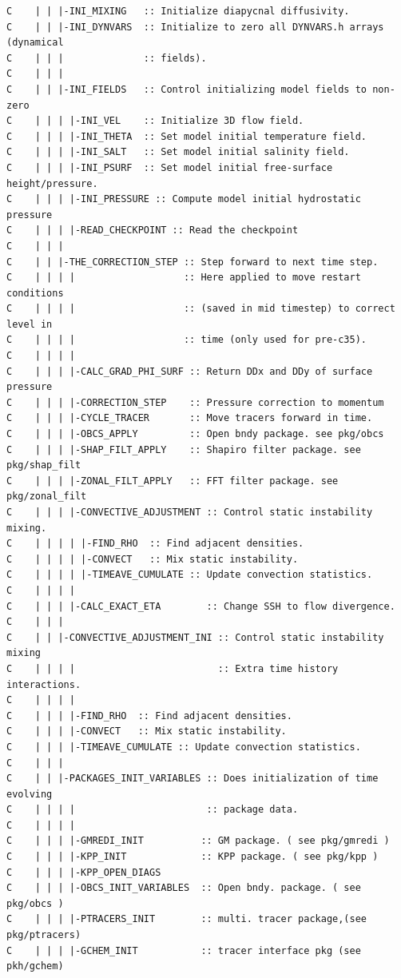 {\begin{verbatim}
C    | | |-INI_MIXING   :: Initialize diapycnal diffusivity.
C    | | |-INI_DYNVARS  :: Initialize to zero all DYNVARS.h arrays (dynamical
C    | | |              :: fields).
C    | | |
C    | | |-INI_FIELDS   :: Control initializing model fields to non-zero
C    | | | |-INI_VEL    :: Initialize 3D flow field.
C    | | | |-INI_THETA  :: Set model initial temperature field.
C    | | | |-INI_SALT   :: Set model initial salinity field.
C    | | | |-INI_PSURF  :: Set model initial free-surface height/pressure.
C    | | | |-INI_PRESSURE :: Compute model initial hydrostatic pressure
C    | | | |-READ_CHECKPOINT :: Read the checkpoint
C    | | |
C    | | |-THE_CORRECTION_STEP :: Step forward to next time step.
C    | | | |                   :: Here applied to move restart conditions
C    | | | |                   :: (saved in mid timestep) to correct level in 
C    | | | |                   :: time (only used for pre-c35).
C    | | | |
C    | | | |-CALC_GRAD_PHI_SURF :: Return DDx and DDy of surface pressure
C    | | | |-CORRECTION_STEP    :: Pressure correction to momentum
C    | | | |-CYCLE_TRACER       :: Move tracers forward in time.
C    | | | |-OBCS_APPLY         :: Open bndy package. see pkg/obcs
C    | | | |-SHAP_FILT_APPLY    :: Shapiro filter package. see pkg/shap_filt
C    | | | |-ZONAL_FILT_APPLY   :: FFT filter package. see pkg/zonal_filt
C    | | | |-CONVECTIVE_ADJUSTMENT :: Control static instability mixing.
C    | | | | |-FIND_RHO  :: Find adjacent densities.
C    | | | | |-CONVECT   :: Mix static instability.
C    | | | | |-TIMEAVE_CUMULATE :: Update convection statistics.
C    | | | | 
C    | | | |-CALC_EXACT_ETA        :: Change SSH to flow divergence.     
C    | | | 
C    | | |-CONVECTIVE_ADJUSTMENT_INI :: Control static instability mixing
C    | | | |                         :: Extra time history interactions.
C    | | | |                       
C    | | | |-FIND_RHO  :: Find adjacent densities.
C    | | | |-CONVECT   :: Mix static instability.
C    | | | |-TIMEAVE_CUMULATE :: Update convection statistics.
C    | | |
C    | | |-PACKAGES_INIT_VARIABLES :: Does initialization of time evolving 
C    | | | |                       :: package data.
C    | | | |
C    | | | |-GMREDI_INIT          :: GM package. ( see pkg/gmredi )
C    | | | |-KPP_INIT             :: KPP package. ( see pkg/kpp )
C    | | | |-KPP_OPEN_DIAGS    
C    | | | |-OBCS_INIT_VARIABLES  :: Open bndy. package. ( see pkg/obcs )
C    | | | |-PTRACERS_INIT        :: multi. tracer package,(see pkg/ptracers)
C    | | | |-GCHEM_INIT           :: tracer interface pkg (see pkh/gchem)

\end{verbatim}}
